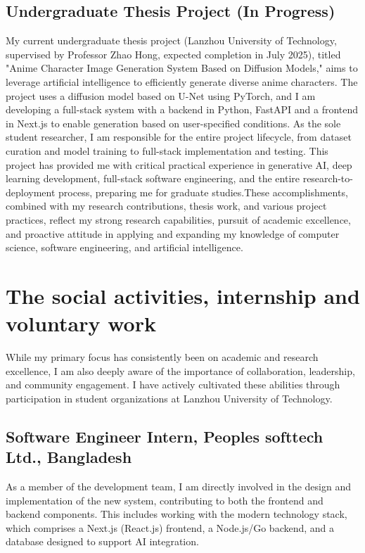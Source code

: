\documentclass[12pt,a4paper]{article}
\begin{document}
\begin{CJK*}{UTF8}{gbsn}
\subsection*{Undergraduate Thesis Project (In Progress)}
My current undergraduate thesis project (Lanzhou University of Technology, supervised by Professor Zhao Hong, expected completion in July 2025), titled "Anime Character Image Generation System Based on Diffusion Models," aims to leverage artificial intelligence to efficiently generate diverse anime characters. The project uses a diffusion model based on U-Net using PyTorch, and I am developing a full-stack system with a backend in Python, FastAPI and a frontend in Next.js to enable generation based on user-specified conditions. As the sole student researcher, I am responsible for the entire project lifecycle, from dataset curation and model training to full-stack implementation and testing. This project has provided me with critical practical experience in generative AI, deep learning development, full-stack software engineering, and the entire research-to-deployment process, preparing me for graduate studies.These accomplishments, combined with my research contributions, thesis work, and various project practices, reflect my strong research capabilities, pursuit of academic excellence, and proactive attitude in applying and expanding my knowledge of computer science, software engineering, and artificial intelligence.

\section*{The social activities, internship and voluntary work}
While my primary focus has consistently been on academic and research excellence, I am also deeply aware of the importance of collaboration, leadership, and community engagement. I have actively cultivated these abilities through participation in student organizations at Lanzhou University of Technology.


\subsection*{Software Engineer Intern, Peoples softtech Ltd., Bangladesh }
As a member of the development team, I am directly involved in the design and implementation of the new system, contributing to both the frontend and backend components. This includes working with the modern technology stack, which comprises a Next.js (React.js) frontend, a Node.js/Go backend, and a database designed to support AI integration.


\end{CJK*}
\end{document}
